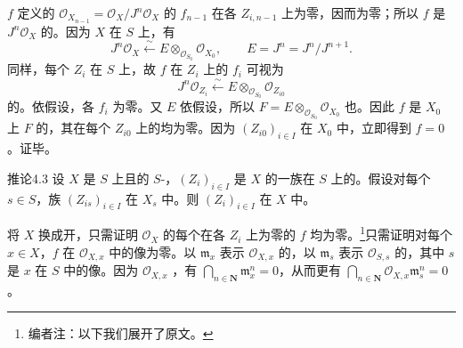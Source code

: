 $f$ 定义的 $\mathcal O_{X_{n-1}}=\mathcal O_X/J^n\mathcal O_X$ 的 $f_{n-1}$ 在各 $Z_{i,n-1}$ 上为零，因而为零；所以 $f$ 是 $J^n\mathcal O_X$ 的。因为 $X$ 在 $S$ 上，有
\[J^n\mathcal O_X\xleftarrow{\sim}E\otimes_{\mathcal O_{S_0}}\mathcal O_{X_0},\qquad E=J^n=J^n/J^{n+1}.\]
同样，每个 $Z_i$ 在 $S$ 上，故 $f$ 在 $Z_i$ 上的 $f_i$ 可视为
\[J^n\mathcal O_{Z_i}\xleftarrow{\sim}E\otimes_{\mathcal O_{S_0}}\mathcal O_{Z_{i0}}\]
的。依假设，各 $f_i$ 为零。又 $E$ 依假设，所以 $F=E\otimes_{\mathcal O_{S_0}}\mathcal O_{X_0}$ 也。因此 $f$ 是 $X_0$ 上 $F$ 的，其在每个 $Z_{i0}$ 上的均为零。因为 $(Z_{i0})_{i\in I}$ 在 $X_0$ 中，立即得到 $f=0$。证毕。
\begin{SGAresult}{推论}{4.3}
设 $X$ 是 $S$ 上且的 $S$-，$(Z_i)_{i\in I}$ 是 $X$ 的一族在 $S$ 上的。假设对每个 $s\in S$，族 $(Z_{is})_{i\in I}$ 在 $X_s$ 中。则 $(Z_i)_{i\in I}$ 在 $X$ 中。
\end{SGAresult}
将 $X$ 换成开，只需证明 $\mathcal O_X$ 的每个在各 $Z_i$ 上为零的 $f$ 均为零。\footnote{编者注：以下我们展开了原文。}只需证明对每个 $x\in X$，$f$ 在 $\mathcal O_{X,x}$ 中的像为零。以 $\mathfrak m_x$ 表示 $\mathcal O_{X,x}$ 的，以 $\mathfrak m_s$ 表示 $\mathcal O_{S,s}$ 的，其中 $s$ 是 $x$ 在 $S$ 中的像。因为 $\mathcal O_{X,x}$ ，有 $\bigcap_{n\in\mathbf N}\mathfrak m_x^n=0$，从而更有 $\bigcap_{n\in\mathbf N}\mathcal O_{X,x}\mathfrak m_s^n=0$。


